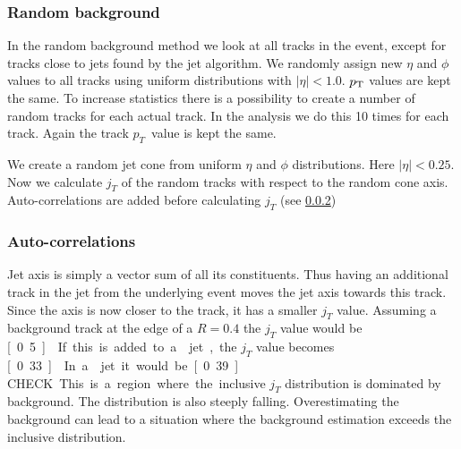 \subsubsection{Random background}
In the random background method we look at all tracks in the event, except for tracks close to jets found by the jet algorithm. We randomly assign new $\eta$ and $\phi$ values to all tracks using uniform distributions with $\left|\eta\right| < 1.0$. $p_{\rm T}$ values are kept the same. To increase statistics there is a possibility to create a number of random tracks for each actual track. In the analysis we do this 10 times for each track. Again the track $p_T$ value is kept the same. 

We create a random jet cone from uniform $\eta$ and $\phi$ distributions. Here $\left| \eta \right| < 0.25$. Now we calculate $j_T$ of the random tracks with respect to the random cone axis. Auto-correlations are added before calculating $j_T$ (see \ref{sec:autoC})
\subsubsection{Auto-correlations}
\label{sec:autoC}
Jet axis is simply a vector sum of all its constituents. Thus having an additional track in the jet from the underlying event moves the jet axis towards this track. Since the axis is now closer to the track, it has a smaller $j_T$ value. Assuming a \unit[1]{\gev} background track  at the edge of a $R = 0.4$ the $j_T$ value would be \unit[0.5]{\gev}. If this is added to a  \unit[5]{\gev} jet, the $j_T$ value becomes \unit[0.33]{\gev}. In a \unit[50]{\gev} jet it would be \unit[0.39]{\gev}.{\color{red} CHECK} This is a region where the inclusive $j_T$ distribution is dominated by background. The distribution is also steeply falling. Overestimating the background can lead to a situation where the background estimation exceeds the inclusive distribution.



